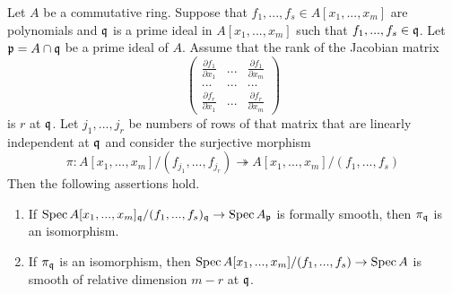 \begin{proposition}\label{proposition:jacobian_criterion}
Let $A$ be a commutative ring. Suppose that $f_1,...,f_s\in A[x_1,...,x_m]$ are polynomials and $\mathfrak{q}$ is a prime ideal in $A[x_1,...,x_m]$ such that $f_1,...,f_s\in \mathfrak{q}$. Let $\mathfrak{p} = A\cap \mathfrak{q}$ be a prime ideal of $A$. Assume that the rank of the Jacobian matrix
$$\begin{pmatrix}
\frac{\partial f_1}{\partial x_1} & ... & \frac{\partial f_1}{\partial x_{m}} \\
... &...  &...  \\
\frac{\partial f_r}{\partial x_{1}} &...  & \frac{\partial f_r}{\partial x_{m}}\end{pmatrix}$$
is $r$ at $\mathfrak{q}$. Let $j_1,...,j_r$ be numbers of rows of that matrix that are linearly independent at $\mathfrak{q}$ and consider the surjective morphism
$$\pi:A[x_1,...,x_m]/(f_{j_1},...,f_{j_r}) \twoheadrightarrow A[x_1,...,x_m]/(f_1,...,f_s)$$
Then the following assertions hold.
\begin{enumerate}[label=\emph{\textbf{(\arabic*)}}, leftmargin=3.0em]
\item If $\mathrm{Spec}\, A[x_1,...,x_m]_{\mathfrak{q}}/(f_1,...,f_s)_{\mathfrak{q}} \rightarrow \mathrm{Spec}\, A_{\mathfrak{p}}$ is formally smooth, then $\pi_{\mathfrak{q}}$ is an isomorphism.
\item If $\pi_{\mathfrak{q}}$ is an isomorphism, then $\mathrm{Spec}\, A[x_1,...,x_m]/(f_1,...,f_s)\rightarrow \mathrm{Spec}\, A$ is smooth of relative dimension $m-r$ at $\mathfrak{q}$.
\end{enumerate}
\end{proposition}
